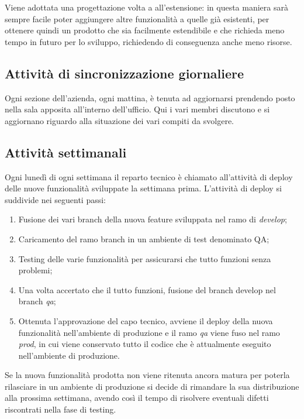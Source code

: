 Viene adottata una progettazione volta a all'estensione: in questa
maniera sarà sempre facile poter aggiungere altre funzionalità a quelle già
esistenti, per ottenere quindi un prodotto che sia facilmente estendibile e che
richieda meno tempo in futuro per lo sviluppo, richiedendo di conseguenza anche
meno risorse.

\subsection{Attività di sincronizzazione giornaliere}

Ogni sezione dell'azienda, ogni mattina, è tenuta ad aggiornarsi prendendo posto
nella sala apposita all'interno dell'ufficio. Qui i vari membri discutono e si
aggiornano riguardo alla situazione dei vari compiti da svolgere.

\subsection{Attività settimanali}
\label{intro:attivitaSettimanali}
Ogni lunedì di ogni settimana il reparto tecnico è chiamato all'attività di
deploy delle nuove funzionalità sviluppate la settimana prima. L'attività di
deploy si suddivide nei seguenti passi:
\begin{enumerate}

\item Fusione dei vari branch della nuova feature sviluppata nel ramo di
\textit{develop};
\item Caricamento del ramo branch in un ambiente di test denominato QA;
\item Testing delle varie funzionalità per assicurarsi che tutto funzioni senza
problemi;
\item Una volta accertato che il tutto funzioni, fusione del branch develop nel
branch \textit{qa};
\item Ottenuta l'approvazione del capo tecnico, avviene il deploy
della nuova funzionalità nell'ambiente di produzione e il ramo \textit{qa}
viene fuso nel ramo \textit{prod}, in cui viene conservato tutto il codice che
è attualmente eseguito nell'ambiente di produzione.
\end{enumerate}

Se la nuova funzionalità prodotta non viene ritenuta ancora matura per poterla
rilasciare in un ambiente di produzione si decide di rimandare la sua
distribuzione alla prossima settimana, avendo così il tempo di risolvere
eventuali difetti riscontrati nella fase di testing.
